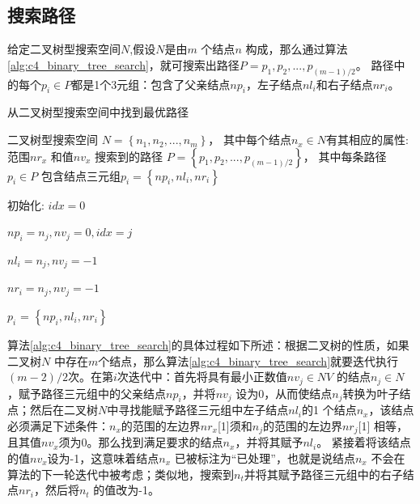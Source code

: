         \subsection{搜索路径}

        给定二叉树型搜索空间$N$,假设$N$是由$m$ 个结点$n$ 构成，那么通过算法\ref{alg:c4_binary_tree_search}，就可搜索出路径$P={p_1,p_2,...,p_{(m-1)/2}}$。 路径中的每个$p_i \in P$都是1个3元组：包含了父亲结点$np_i$，左子结点$nl_i$和右子结点$nr_i$。

        \begin{algorithm}[!h]
    	\renewcommand{\algorithmicrequire}{\textbf{输入:}}	
        \renewcommand{\algorithmicensure}{\textbf{输出:}}
    	\caption{从二叉树型搜索空间中找到最优路径}
    	\label{alg:c4_binary_tree_search}
    	\begin{algorithmic}[1]
    		\REQUIRE 二叉树型搜索空间 $N=\left\{n_1,n_2,...,n_m\right\}$， 其中每个结点$n_x \in N$有其相应的属性: 范围$nr_x$ 和值$nv_x$
    		\ENSURE 搜索到的路径 $P=\left\{p_1,p_2,...,p_{(m-1)/2}\right\}$， 其中每条路径$p_{i} \in P$ 包含结点三元组$p_{i}=\left\{np_{i},nl_{i},nr_{i}\right\}$

          \STATE 初始化: $idx=0$

          \STATE $np_i = n_j, nv_j = 0, idx = j$
          \ENDIF

          \STATE $nl_i = n_j, nv_j = -1$
          \ENDIF

          \STATE $nr_i = n_j, nv_j = -1$
          \ENDIF

          \ENDFOR

          \STATE $p_{i}$ = $\left\{ np_{i},nl_{i},nr_{i} \right\}$

          \ENDFOR
    	  \end{algorithmic}
        \end{algorithm}

        算法\ref{alg:c4_binary_tree_search}的具体过程如下所述：根据二叉树的性质，如果二叉树$N$ 中存在$m$个结点，那么算法\ref{alg:c4_binary_tree_search}就要迭代执行$(m-2)/2$次。在第$i$次迭代中：首先将具有最小正数值$nv_j \in NV$ 的结点$n_j \in N$，赋予路径三元组中的父亲结点$np_i$，并将$nv_j$ 设为0，从而使结点$n_j$转换为叶子结点；然后在二叉树$N$中寻找能赋予路径三元组中左子结点$nl_i$的1 个结点$n_x$，该结点必须满足下述条件：$n_x$的范围的左边界$nr_x$[1]须和$n_j$的范围的左边界$nr_j$[1] 相等，且其值$nv_x$须为0。那么找到满足要求的结点$n_x$，并将其赋予$nl_i$。 紧接着将该结点的值$nv_x$设为-1，这意味着结点$n_x$ 已被标注为``已处理''，也就是说结点$n_x$ 不会在算法的下一轮迭代中被考虑；类似地，搜索到$n_t$并将其赋予路径三元组中的右子结点$nr_i$，然后将$n_t$ 的值改为-1。

